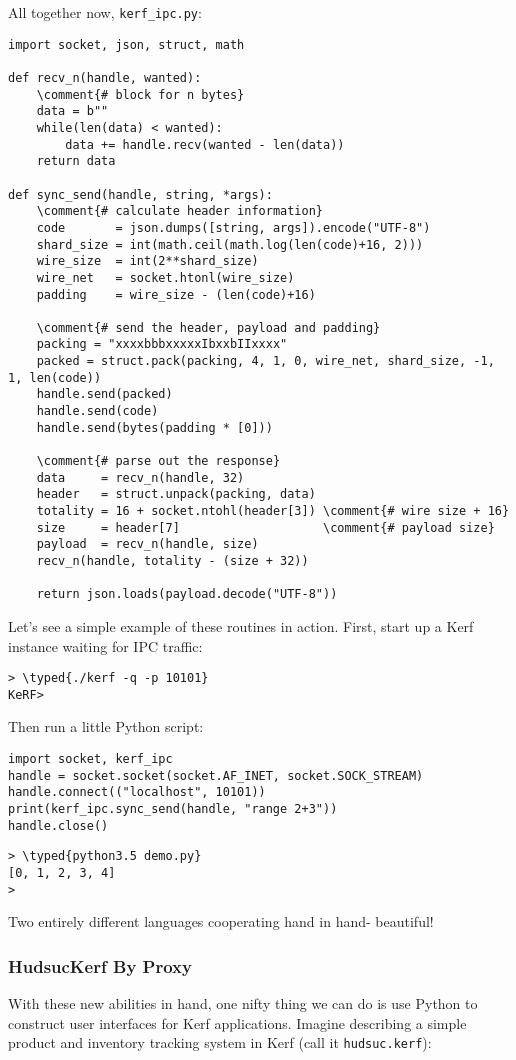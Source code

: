 \documentclass{article}
\newcommand{\typed}[1]{\textcolor{TealBlue}{#1}}
\newcommand{\comment}[1]{\textcolor{Orange}{#1}}
\begin{document}
\pagebreak
All together now, \texttt{kerf\_ipc.py}:
\begin{Verbatim}
import socket, json, struct, math

def recv_n(handle, wanted):
	\comment{# block for n bytes}
	data = b""
	while(len(data) < wanted):
		data += handle.recv(wanted - len(data))
	return data

def sync_send(handle, string, *args):
	\comment{# calculate header information}
	code       = json.dumps([string, args]).encode("UTF-8")
	shard_size = int(math.ceil(math.log(len(code)+16, 2)))
	wire_size  = int(2**shard_size)
	wire_net   = socket.htonl(wire_size)
	padding    = wire_size - (len(code)+16)

	\comment{# send the header, payload and padding}
	packing = "xxxxbbbxxxxxIbxxbIIxxxx"
	packed = struct.pack(packing, 4, 1, 0, wire_net, shard_size, -1, 1, len(code))
	handle.send(packed)
	handle.send(code)
	handle.send(bytes(padding * [0]))

	\comment{# parse out the response}
	data     = recv_n(handle, 32)
	header   = struct.unpack(packing, data)
	totality = 16 + socket.ntohl(header[3]) \comment{# wire size + 16}
	size     = header[7]                    \comment{# payload size}
	payload  = recv_n(handle, size)
	recv_n(handle, totality - (size + 32))

	return json.loads(payload.decode("UTF-8"))

\end{Verbatim}

Let's see a simple example of these routines in action. First, start up a Kerf instance waiting for IPC traffic:
\begin{Verbatim}
> \typed{./kerf -q -p 10101}
KeRF>
\end{Verbatim}

Then run a little Python script:
\begin{Verbatim}
import socket, kerf_ipc
handle = socket.socket(socket.AF_INET, socket.SOCK_STREAM)
handle.connect(("localhost", 10101))
print(kerf_ipc.sync_send(handle, "range 2+3"))
handle.close()
\end{Verbatim}
\begin{Verbatim}
> \typed{python3.5 demo.py}
[0, 1, 2, 3, 4]
>
\end{Verbatim}
Two entirely different languages cooperating hand in hand- beautiful!

\subsubsection{HudsucKerf By Proxy}
With these new abilities in hand, one nifty thing we can do is use Python to construct user interfaces for Kerf applications. Imagine describing a simple product and inventory tracking system in Kerf (call it \texttt{hudsuc.kerf}):
\end{document}
